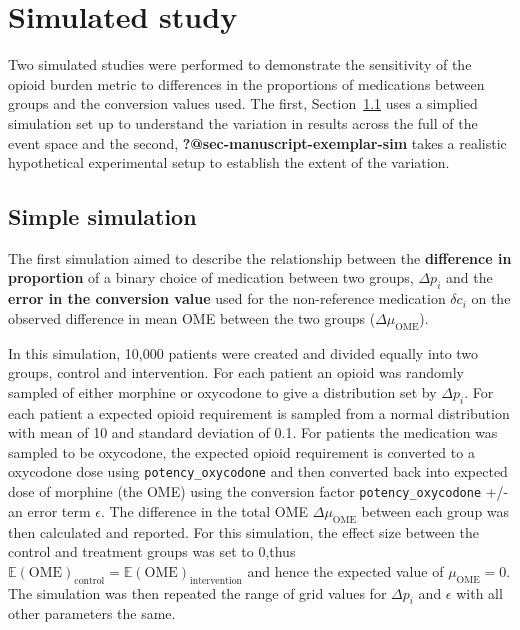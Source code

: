 \documentclass[
  letterpaper,
  DIV=11,
  numbers=noendperiod]{scrreprt}
\begin{document}
\section{Simulated study}\label{simulated-study}

Two simulated studies were performed to demonstrate the sensitivity of
the opioid burden metric to differences in the proportions of
medications between groups and the conversion values used. The first,
Section~\ref{sec-manuscript-simple-sim} uses a simplied simulation set
up to understand the variation in results across the full of the event
space and the second, \textbf{?@sec-manuscript-exemplar-sim} takes a
realistic hypothetical experimental setup to establish the extent of the
variation.

\subsection{Simple simulation}\label{sec-manuscript-simple-sim}

The first simulation aimed to describe the relationship between the
\textbf{difference in proportion} of a binary choice of medication
between two groups, \(\Delta p_i\) and the \textbf{error in the
conversion value} used for the non-reference medication \(\delta c_{i}\)
on the observed difference in mean OME between the two groups
(\(\Delta \mu_{\text{OME}}\)).

In this simulation, 10,000 patients were created and divided equally
into two groups, control and intervention. For each patient an opioid
was randomly sampled of either morphine or oxycodone to give a
distribution set by \(\Delta p_i\). For each patient a expected opioid
requirement is sampled from a normal distribution with mean of 10 and
standard deviation of 0.1. For patients the medication was sampled to be
oxycodone, the expected opioid requirement is converted to a oxycodone
dose using \texttt{potency\_oxycodone} and then converted back into
expected dose of morphine (the OME) using the conversion factor
\texttt{potency\_oxycodone} +/- an error term \(\epsilon\). The
difference in the total OME \(\Delta \mu_{\text{OME}}\) between each
group was then calculated and reported. For this simulation, the effect
size between the control and treatment groups was set to 0,thus
\(\mathbb{E}(\text{OME})_{\text{control}} = \mathbb{E}(\text{OME})_{\text{intervention}}\)
and hence the expected value of \(\mu_{\text{OME}} = 0\). The simulation
was then repeated the range of grid values for \(\Delta p_i\) and
\(\epsilon\) with all other parameters the same.
\end{document}
